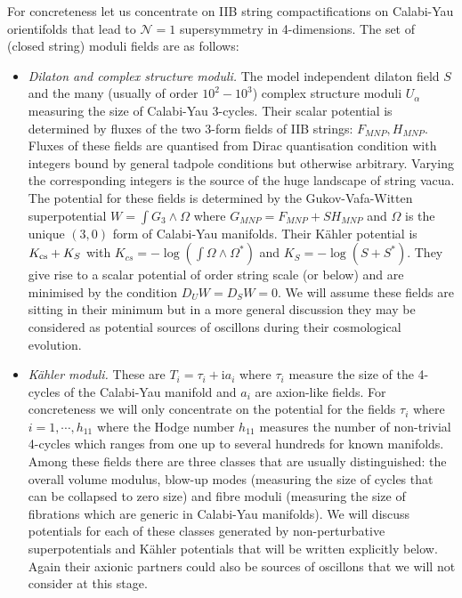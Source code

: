 \documentclass[12pt]{article}
\begin{document}
For concreteness let us concentrate on IIB string compactifications on Calabi-Yau orientifolds that lead to $\mathcal{N}=1$ supersymmetry in 4-dimensions. The set of (closed string) moduli fields are as follows:
\begin{itemize}
\item{} {\it Dilaton and complex structure moduli.} The model independent dilaton field $S$ and the many (usually of order $10^2-10^3$) complex structure moduli $U_\alpha$ measuring the size of Calabi-Yau 3-cycles. Their scalar potential is determined by fluxes of the two 3-form fields of IIB strings: $F_{MNP}, H_{MNP}$. Fluxes of these fields are quantised from Dirac quantisation condition with integers bound by general tadpole conditions but otherwise arbitrary. Varying the corresponding integers is the source of the huge landscape of string vacua. The potential for these fields is determined by the Gukov-Vafa-Witten superpotential $W=\int G_3\wedge \Omega$ where $G_{MNP}= F_{MNP}+SH_{MNP}$ and $\Omega $ is the unique $(3,0)$ form of Calabi-Yau manifolds. Their K\"ahler potential is $K_{\rm cs}+K_S$ with $K_{cs}=-\log{\left(\int\Omega\wedge \Omega^*\right)}$ and $K_S=-\log(S+S^*)$. They give rise to a scalar potential of order string scale (or below) and are minimised by the condition $D_UW=D_SW=0$. We will assume these fields are sitting in their minimum but in a more general discussion they may be considered as potential sources of oscillons during their cosmological evolution.

\item{} {\it K\"ahler moduli.} These are $T_i=\tau_i+{\mathrm i} a_i$ where $\tau_i$ measure the size of the 4-cycles of the Calabi-Yau manifold and $a_i$ are axion-like fields. For concreteness we will only concentrate on the potential for the fields $\tau_i$ where $i=1,\cdots, h_{11}$ where the Hodge number $h_{11}$ measures the number of non-trivial 4-cycles which ranges from one up to several hundreds for known manifolds. Among these fields there are three classes that are usually distinguished: the overall volume modulus, blow-up modes (measuring the size of cycles that can be collapsed to zero size) and fibre moduli (measuring the size of fibrations which are generic in Calabi-Yau manifolds). We will discuss potentials for each of these classes generated by non-perturbative superpotentials and K\"ahler potentials that will be written explicitly below. Again their axionic partners could also be sources of oscillons that we will not consider at this stage.

\end{itemize}
\end{document}
